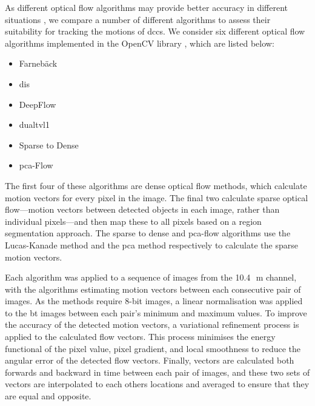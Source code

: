 As different optical flow algorithms may provide better accuracy in different situations \citep{baker_database_2011}, we compare a number of different algorithms to assess their suitability for tracking the motions of \acrshort{dcc}s.
We consider six different optical flow algorithms implemented in the OpenCV library \citep{opencv_library}, which are listed below:

\begin{itemize}
    \item Farnebäck \citep{farneback_two-frame_2003}
    \item \acrshort{dis} \citep{kroeger_fast_2016}
    \item DeepFlow \citep{weinzaepfel_deepflow_2013}
    \item \acrshort{dualtvl1} \citep{zach_duality_2007, perez_tv-l1_2013}
    \item Sparse to Dense \citep{bouguet_pyramidal_1999}
    \item \acrshort{pca}-Flow \citep{wulff_efficient_2015}
\end{itemize}

The first four of these algorithms are dense optical flow methods, which calculate motion vectors for every pixel in the image.
The final two calculate sparse optical flow---motion vectors between detected objects in each image, rather than individual pixels---and then map these to all pixels based on a region segmentation approach.
The sparse to dense and \acrshort{pca}-flow algorithms use the Lucas-Kanade method \citep{lucas_iterative_1981} and the \acrshort{pca} method respectively to calculate the sparse motion vectors.

Each algorithm was applied to a sequence of images from the 10.4\,\unit{\mu m} channel, with the algorithms estimating motion vectors between each consecutive pair of images.
As the methods require 8-bit images, a linear normalisation was applied to the \acrshort{bt} images between each pair's minimum and maximum values.
To improve the accuracy of the detected motion vectors, a variational refinement process \citep{brox_high_2004} is applied to the calculated flow vectors.
This process minimises the energy functional of the pixel value, pixel gradient, and local smoothness to reduce the angular error of the detected flow vectors.
Finally, vectors are calculated both forwards and backward in time between each pair of images, and these two sets of vectors are interpolated to each others locations and averaged to ensure that they are equal and opposite.


